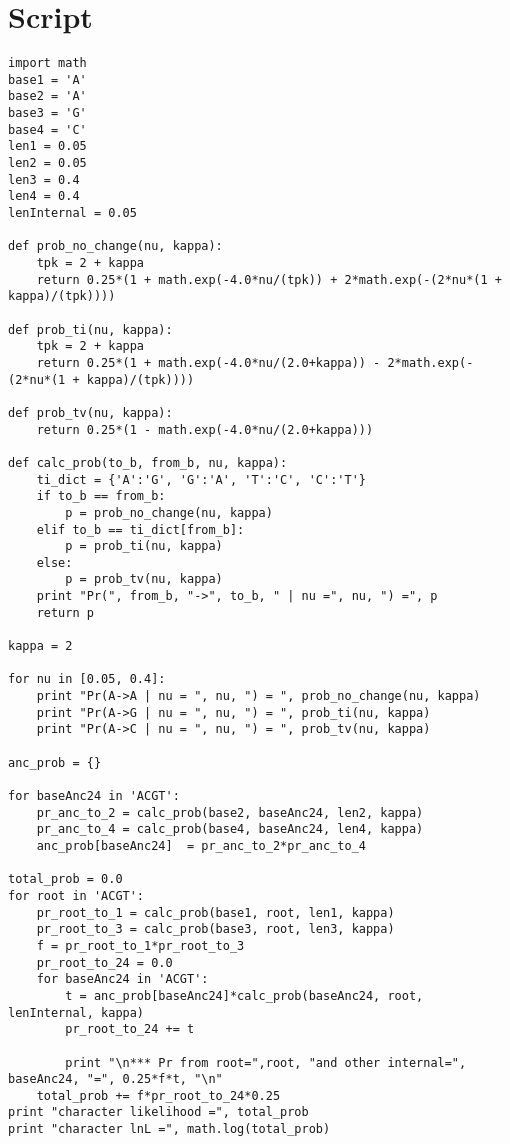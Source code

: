 \documentclass[landscape]{foils}
\begin{document}
\section*{Script}
\begin{verbatim}
import math
base1 = 'A'
base2 = 'A'
base3 = 'G'
base4 = 'C'
len1 = 0.05
len2 = 0.05
len3 = 0.4
len4 = 0.4
lenInternal = 0.05

def prob_no_change(nu, kappa):
    tpk = 2 + kappa 
    return 0.25*(1 + math.exp(-4.0*nu/(tpk)) + 2*math.exp(-(2*nu*(1 + kappa)/(tpk))))

def prob_ti(nu, kappa):
    tpk = 2 + kappa 
    return 0.25*(1 + math.exp(-4.0*nu/(2.0+kappa)) - 2*math.exp(-(2*nu*(1 + kappa)/(tpk))))

def prob_tv(nu, kappa):
    return 0.25*(1 - math.exp(-4.0*nu/(2.0+kappa)))

def calc_prob(to_b, from_b, nu, kappa):
    ti_dict = {'A':'G', 'G':'A', 'T':'C', 'C':'T'}
    if to_b == from_b:
        p = prob_no_change(nu, kappa)
    elif to_b == ti_dict[from_b]:
        p = prob_ti(nu, kappa)
    else:
        p = prob_tv(nu, kappa)
    print "Pr(", from_b, "->", to_b, " | nu =", nu, ") =", p
    return p

kappa = 2

for nu in [0.05, 0.4]:
    print "Pr(A->A | nu = ", nu, ") = ", prob_no_change(nu, kappa)
    print "Pr(A->G | nu = ", nu, ") = ", prob_ti(nu, kappa)
    print "Pr(A->C | nu = ", nu, ") = ", prob_tv(nu, kappa)

anc_prob = {}

for baseAnc24 in 'ACGT':
    pr_anc_to_2 = calc_prob(base2, baseAnc24, len2, kappa)
    pr_anc_to_4 = calc_prob(base4, baseAnc24, len4, kappa)
    anc_prob[baseAnc24]  = pr_anc_to_2*pr_anc_to_4

total_prob = 0.0
for root in 'ACGT':
    pr_root_to_1 = calc_prob(base1, root, len1, kappa)
    pr_root_to_3 = calc_prob(base3, root, len3, kappa)
    f = pr_root_to_1*pr_root_to_3
    pr_root_to_24 = 0.0
    for baseAnc24 in 'ACGT':
        t = anc_prob[baseAnc24]*calc_prob(baseAnc24, root, lenInternal, kappa)
        pr_root_to_24 += t
        
        print "\n*** Pr from root=",root, "and other internal=", baseAnc24, "=", 0.25*f*t, "\n"
    total_prob += f*pr_root_to_24*0.25
print "character likelihood =", total_prob
print "character lnL =", math.log(total_prob)
\end{verbatim}
\end{document}
